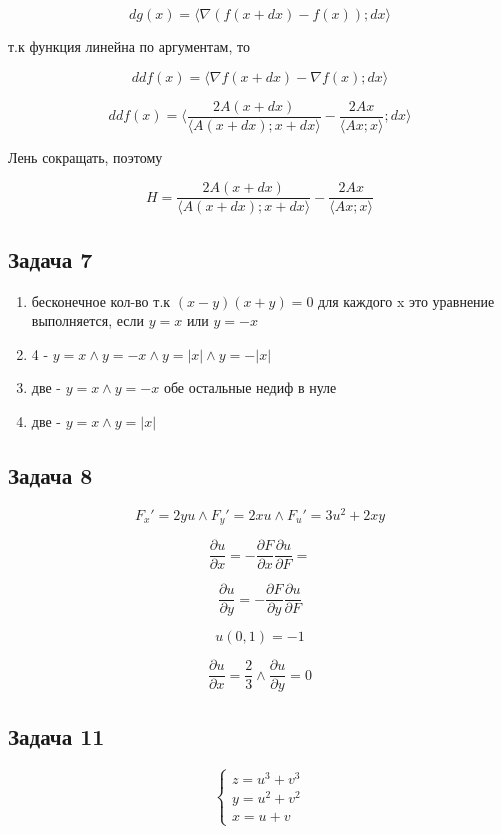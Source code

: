 \documentclass[a4paper,12pt]{article}
\begin{document}
\[
dg(x) =  \langle \nabla (f(x+dx)-f(x)); dx \rangle
\]

т.к функция линейна по аргументам, то 

\[
ddf(x) =  \langle \nabla f(x+dx)-\nabla f(x); dx \rangle
\]

\[
ddf(x) = \langle \frac{2A(x+dx)}{\langle A(x+dx); x+dx \rangle}-\frac{2Ax}{\langle Ax; x \rangle}; dx \rangle
\]

Лень сокращать, поэтому 

\[
H = \frac{2A(x+dx)}{\langle A(x+dx); x+dx \rangle}-\frac{2Ax}{\langle Ax; x \rangle}
\]

\subsection{Задача 7}
\begin{enumerate}
    \item бесконечное кол-во т.к $(x-y)(x+y) = 0$ для каждого x это уравнение выполняется, если $y=x$ или $y=-x$
    \item 4 - $y=x \land y=-x \land y=|x| \land y= -|x|$
    \item две - $y=x \land y=-x$ обе остальные недиф в нуле
    \item две  - $y=x \land y=|x|$
\end{enumerate}

\subsection{Задача 8}
\[
F_x' =2yu \land F_y' = 2xu \land F_u' = 3u^2+2xy 
\]

\[
\frac{\partial u}{\partial x} = -\frac{\partial F}{\partial x} \frac{\partial u}{\partial F} = 
\]

\[
\frac{\partial u}{\partial y} = -\frac{\partial F}{\partial y} \frac{\partial u}{\partial F}
\]

\[
u(0, 1) = -1
\]

\[
\frac{\partial u}{\partial x} = \frac{2}{3} \land \frac{\partial u}{\partial y} = 0
\]

\subsection{Задача 11}
\[
\begin{cases}
    z = u^3 + v^3 \\
    y = u^2 + v^2 \\
    x = u+v
\end{cases}
\]
\end{document}
